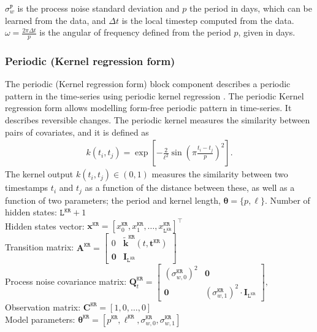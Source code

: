 \noindent
$\sigma_{w}^{\mathtt{P}}$ is the process noise standard deviation and $p$ the period in days, which can be learned from the data, and $\Delta t$ is the local timestep computed from the data.
 $\omega=\frac{2\pi \Delta t}{p}$ is the angular of frequency defined from the period $p$, given in days.


\subsubsection{Periodic (Kernel regression form)}

The periodic (Kernel regression form) block component describes a periodic pattern in the time-series using periodic kernel regression  \cite{Nguyen2019KRBDLM}. 
The periodic Kernel regression form allows modelling form-free periodic pattern in time-series.
It describes reversible changes.
The periodic kernel measures the similarity between pairs of covariates, and it is defined as
\begin{gather*}
k(t_{i},t_{j})=\exp\left[-\frac{2}{\ell^2}\sin\left( \pi\frac{t_i-t_{j}}{p}\right)^{2}\right].
\end{gather*}
The kernel output $k(t_{i},t_{j})\in(0,1)$ measures the similarity between two timestamps $t_{i}$ and $t_{j}$ as a function of the distance between these, as well as a function of two parameters; the period and kernel length, $\bm{\theta}=\{p,\ell\}$.
\noindent
Number of hidden states: $\mathtt{L}^{\mathtt{KR}}+1$\\
Hidden states vector: $ \mathbf{x}^{\mathtt{KR}} = [x^{\mathtt{KR}}_{0}, x^{\mathtt{KR}}_{1}, \dots, x^{\mathtt{KR}}_{\mathtt{L}^{\mathtt{KR}}}]^{\intercal}$\\
Transition matrix: $\mathbf{A}^{\mathtt{KR}}= \left[\begin{array}{cc}0 &\tilde{\bm k}^{\mathtt{KR}}(t, \mathbf{t}^{\mathtt{KR}})\\\mathbf{0}&\mathbf{I}_{\mathtt{L}^{\mathtt{KR}}}\end{array}\right]$\\
Process noise covariance matrix: $\mathbf{Q}_{t}^{\mathtt{KR}}=\left[\begin{array}{cc}(\sigma_{w,0}^{\mathtt{KR}})^{2} &\mathbf{0}\\\mathbf{0}&(\sigma_{w,1}^{\mathtt{KR}})^{2}\cdot\mathbf{I}_{\mathtt{L}^{\mathtt{KR}} }\end{array}\right],$\\
Observation matrix: $\mathbf{C}^{\mathtt{KR}}=[1, 0, \dots, 0]$\\
Model parameters: $\bm\theta^{\mathtt{KR}}=[ p^{\mathtt{KR}},\ell^{\mathtt{KR}},  \sigma_{w,0}^{\mathtt{KR}}, \sigma_{w,1}^{\mathtt{KR}}]$\\


